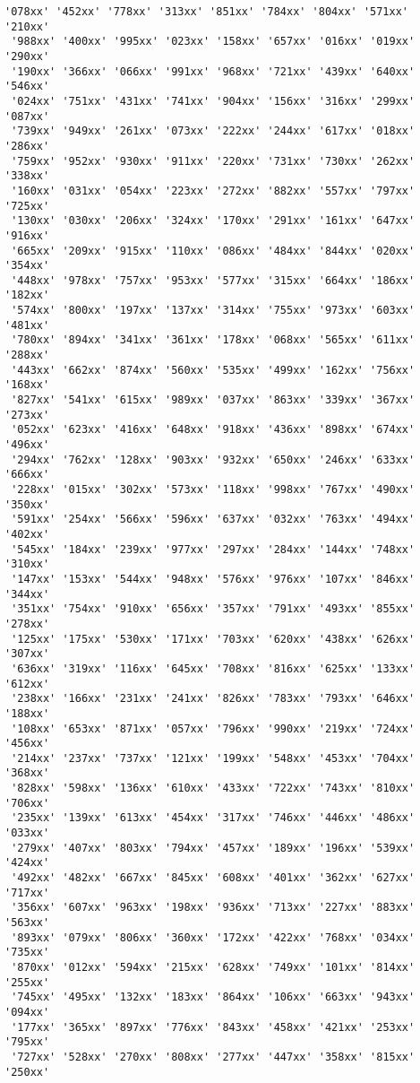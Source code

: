 \documentclass[11pt]{article}
\begin{document}
\begin{Verbatim}[commandchars=\\\{\}]
 '078xx' '452xx' '778xx' '313xx' '851xx' '784xx' '804xx' '571xx' '210xx'
 '988xx' '400xx' '995xx' '023xx' '158xx' '657xx' '016xx' '019xx' '290xx'
 '190xx' '366xx' '066xx' '991xx' '968xx' '721xx' '439xx' '640xx' '546xx'
 '024xx' '751xx' '431xx' '741xx' '904xx' '156xx' '316xx' '299xx' '087xx'
 '739xx' '949xx' '261xx' '073xx' '222xx' '244xx' '617xx' '018xx' '286xx'
 '759xx' '952xx' '930xx' '911xx' '220xx' '731xx' '730xx' '262xx' '338xx'
 '160xx' '031xx' '054xx' '223xx' '272xx' '882xx' '557xx' '797xx' '725xx'
 '130xx' '030xx' '206xx' '324xx' '170xx' '291xx' '161xx' '647xx' '916xx'
 '665xx' '209xx' '915xx' '110xx' '086xx' '484xx' '844xx' '020xx' '354xx'
 '448xx' '978xx' '757xx' '953xx' '577xx' '315xx' '664xx' '186xx' '182xx'
 '574xx' '800xx' '197xx' '137xx' '314xx' '755xx' '973xx' '603xx' '481xx'
 '780xx' '894xx' '341xx' '361xx' '178xx' '068xx' '565xx' '611xx' '288xx'
 '443xx' '662xx' '874xx' '560xx' '535xx' '499xx' '162xx' '756xx' '168xx'
 '827xx' '541xx' '615xx' '989xx' '037xx' '863xx' '339xx' '367xx' '273xx'
 '052xx' '623xx' '416xx' '648xx' '918xx' '436xx' '898xx' '674xx' '496xx'
 '294xx' '762xx' '128xx' '903xx' '932xx' '650xx' '246xx' '633xx' '666xx'
 '228xx' '015xx' '302xx' '573xx' '118xx' '998xx' '767xx' '490xx' '350xx'
 '591xx' '254xx' '566xx' '596xx' '637xx' '032xx' '763xx' '494xx' '402xx'
 '545xx' '184xx' '239xx' '977xx' '297xx' '284xx' '144xx' '748xx' '310xx'
 '147xx' '153xx' '544xx' '948xx' '576xx' '976xx' '107xx' '846xx' '344xx'
 '351xx' '754xx' '910xx' '656xx' '357xx' '791xx' '493xx' '855xx' '278xx'
 '125xx' '175xx' '530xx' '171xx' '703xx' '620xx' '438xx' '626xx' '307xx'
 '636xx' '319xx' '116xx' '645xx' '708xx' '816xx' '625xx' '133xx' '612xx'
 '238xx' '166xx' '231xx' '241xx' '826xx' '783xx' '793xx' '646xx' '188xx'
 '108xx' '653xx' '871xx' '057xx' '796xx' '990xx' '219xx' '724xx' '456xx'
 '214xx' '237xx' '737xx' '121xx' '199xx' '548xx' '453xx' '704xx' '368xx'
 '828xx' '598xx' '136xx' '610xx' '433xx' '722xx' '743xx' '810xx' '706xx'
 '235xx' '139xx' '613xx' '454xx' '317xx' '746xx' '446xx' '486xx' '033xx'
 '279xx' '407xx' '803xx' '794xx' '457xx' '189xx' '196xx' '539xx' '424xx'
 '492xx' '482xx' '667xx' '845xx' '608xx' '401xx' '362xx' '627xx' '717xx'
 '356xx' '607xx' '963xx' '198xx' '936xx' '713xx' '227xx' '883xx' '563xx'
 '893xx' '079xx' '806xx' '360xx' '172xx' '422xx' '768xx' '034xx' '735xx'
 '870xx' '012xx' '594xx' '215xx' '628xx' '749xx' '101xx' '814xx' '255xx'
 '745xx' '495xx' '132xx' '183xx' '864xx' '106xx' '663xx' '943xx' '094xx'
 '177xx' '365xx' '897xx' '776xx' '843xx' '458xx' '421xx' '253xx' '795xx'
 '727xx' '528xx' '270xx' '808xx' '277xx' '447xx' '358xx' '815xx' '250xx'

\end{Verbatim}
\end{document}
